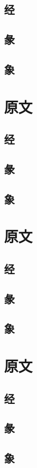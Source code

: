 \documentclass[12pt,oneside]{book}
\begin{document}
\subsection{经}
\subsection{彖}
\subsection{象}

\section{原文}
\subsection{经}
\subsection{彖}
\subsection{象}

\section{原文}
\subsection{经}
\subsection{彖}
\subsection{象}

\section{原文}
\subsection{经}
\subsection{彖}
\subsection{象}
\end{document}

